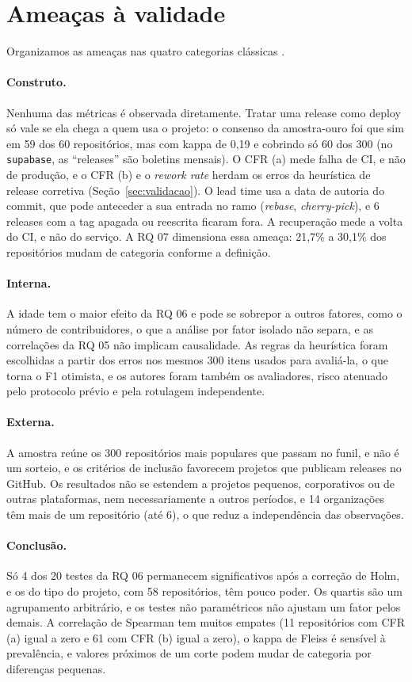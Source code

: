 \section{Ameaças à validade}

Organizamos as ameaças nas quatro categorias clássicas \cite{wohlin2012experimentation}.

\paragraph{Construto.} Nenhuma das métricas é observada diretamente. Tratar uma release como deploy só vale se ela chega a quem usa o projeto: o consenso da amostra-ouro foi que sim em 59 dos 60 repositórios, mas com kappa de 0,19 e cobrindo só 60 dos 300 (no \texttt{supabase}, as ``releases'' são boletins mensais). O CFR (a) mede falha de CI, e não de produção, e o CFR (b) e o \textit{rework rate} herdam os erros da heurística de release corretiva (Seção~\ref{sec:validacao}). O lead time usa a data de autoria do commit, que pode anteceder a sua entrada no ramo (\textit{rebase}, \textit{cherry-pick}), e 6 releases com a tag apagada ou reescrita ficaram fora. A recuperação mede a volta do CI, e não do serviço. A RQ 07 dimensiona essa ameaça: 21,7\% a 30,1\% dos repositórios mudam de categoria conforme a definição.

\paragraph{Interna.} A idade tem o maior efeito da RQ 06 e pode se sobrepor a outros fatores, como o número de contribuidores, o que a análise por fator isolado não separa, e as correlações da RQ 05 não implicam causalidade. As regras da heurística foram escolhidas a partir dos erros nos mesmos 300 itens usados para avaliá-la, o que torna o F1 otimista, e os autores foram também os avaliadores, risco atenuado pelo protocolo prévio e pela rotulagem independente.

\paragraph{Externa.} A amostra reúne os 300 repositórios mais populares que passam no funil, e não é um sorteio, e os critérios de inclusão favorecem projetos que publicam releases no GitHub. Os resultados não se estendem a projetos pequenos, corporativos ou de outras plataformas, nem necessariamente a outros períodos, e 14 organizações têm mais de um repositório (até 6), o que reduz a independência das observações.

\paragraph{Conclusão.} Só 4 dos 20 testes da RQ 06 permanecem significativos após a correção de Holm, e os do tipo do projeto, com 58 repositórios, têm pouco poder. Os quartis são um agrupamento arbitrário, e os testes não paramétricos não ajustam um fator pelos demais. A correlação de Spearman tem muitos empates (11 repositórios com CFR (a) igual a zero e 61 com CFR (b) igual a zero), o kappa de Fleiss é sensível à prevalência, e valores próximos de um corte podem mudar de categoria por diferenças pequenas.
